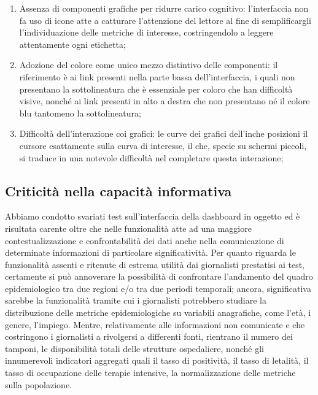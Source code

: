 \documentclass[../../main.tex]{subfiles}
\begin{document}
\begin{enumerate}
    \item Assenza di componenti grafiche per ridurre carico cognitivo: l'interfaccia non fa uso di icone atte a catturare l'attenzione del lettore al fine di semplificargli l'individuazione delle metriche di interesse, costringendolo a leggere attentamente ogni etichetta;
    \item Adozione del colore come unico mezzo distintivo delle componenti: il riferimento è ai link presenti nella parte bassa dell'interfaccia, i quali non presentano la sottolineatura che è essenziale per coloro che han difficoltà visive, nonché ai link presenti in alto a destra che non presentano né il colore blu tantomeno la sottolineatura;
    \item Difficoltà dell'interazione coi grafici: le curve dei grafici dell'inche posizioni il cursore esattamente sulla curva di interesse, il che, specie su schermi piccoli, si traduce in una notevole difficoltà nel completare questa interazione;
\end{enumerate}

\subsection{Criticità nella capacità informativa}
Abbiamo condotto svariati test sull'interfaccia della dashboard in oggetto ed è risultata carente oltre che nelle funzionalità atte ad una maggiore contestualizzazione e confrontabilità dei dati anche nella comunicazione di determinate informazioni di particolare significatività.
Per quanto riguarda le funzionalità assenti e ritenute di estrema utilità dai giornalisti prestatisi ai test, certamente si può annoverare la possibilità di confrontare l'andamento del quadro epidemiologico tra due regioni e/o tra due periodi temporali; ancora, significativa sarebbe la funzionalità tramite cui i giornalisti potrebbero studiare la distribuzione delle metriche epidemiologiche su variabili anagrafiche, come l'età, i genere, l'impiego.
Mentre, relativamente alle informazioni non comunicate e che costringono i giornalisti a rivolgersi a differenti fonti, rientrano il numero dei tamponi, le disponibilità totali delle strutture ospedaliere, nonché gli innumerevoli indicatori aggregati quali il tasso di positività, il tasso di letalità, il tasso di occupazione delle terapie intensive, la normalizzazione delle metriche sulla popolazione.
\end{document}
